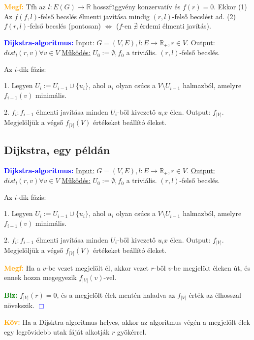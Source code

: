 \documentclass[../szamtud.tex]{subfiles}
\begin{document}
			\textbf{\textcolor{orange}{Megf:}} Tfh az $l : E(G) \rightarrow \mathbb{R}$ hosszfüggvény konzervatív és $f(r) = 0$. Ekkor (1) Az $f (f,l)$-felső becslés élmenti javítása mindig $(r,l)$-felső becslést ad. (2) $f(r,l)$-felső becslés (pontosan) $\Leftrightarrow$ ($f$-en $\nexists$ érdemi élmenti javítás).

			\textbf{\textcolor{blue}{Dijkstra-algoritmus:}} \underline{Input:} $G = (V,E), l : E \rightarrow \mathbb{R}_+, r \in V$. \underline{Output:} $dist_l(r,v) \forall v \in V$ \underline{Működés:} $U_0 := \emptyset, f_0$ a triviális. $(r,l)$-felső becslés. 
			
			Az $i$-dik fázis:

			1. Legyen $U_i := U_{i-1} \cup \{u_i\}$, ahol $u_i$ olyan csúcs a $V  \setminus  U_{i-1}$ halmazból, amelyre $f_{i-1}(v)$ minimális.

			2. $f_i:f_{i-1}$ élmenti javítása minden $U_i$-ből kivezető $u_ix$ élen. Output: $f_{|V|}$. Megjelöljük a végső $f_{|V|}(V)$ értékeket beállító éleket.
			
		\subsection{Dijkstra, egy példán}

			\textbf{\textcolor{blue}{Dijkstra-algoritmus:}} \underline{Input:} $G = (V,E), l : E \rightarrow \mathbb{R}_+, r \in V$. \underline{Output:} $dist_l(r,v) \forall v \in V$ \underline{Működés:} $U_0 := \emptyset, f_0$ a triviális. $(r,l)$-felső becslés. 
				
			Az $i$-dik fázis:

			1. Legyen $U_i := U_{i-1} \cup \{u_i\}$, ahol $u_i$ olyan csúcs a $V  \setminus  U_{i-1}$ halmazból, amelyre $f_{i-1}(v)$ minimális.

			2. $f_i:f_{i-1}$ élmenti javítása minden $U_i$-ből kivezető $u_ix$ élen. Output: $f_{|V|}$. Megjelöljük a végső $f_{|V|}(V)$ értékeket beállító éleket.
			
			\textcolor{orange}{\textbf{Megf:}} Ha a $v$-be vezet megjelölt él, akkor vezet $r$-ből $v$-be megjelölt éleken út, és ennek hozza megegyezik $f_{|V|} (v)$-vel.

			\textcolor{green}{\textbf{Biz:}} $f_{|V|} (r) = 0$, és a megjelölt élek mentén haladva az $f_{|V|}$ érték az élhosszal növekszik.  \textcolor{blue}{$\Box$}

			\textcolor{orange}{\textbf{Köv:}} Ha a Dijsktra-algoritmus helyes, akkor az algoritmus végén a megjelölt élek egy legrövidebb utak fáját alkotják $r$ gyökérrel.
\end{document}
